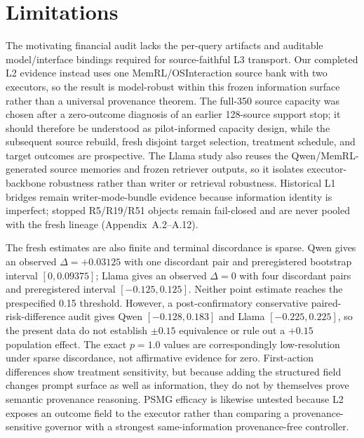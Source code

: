 \section{Limitations}
The motivating financial audit lacks the per-query artifacts and auditable model/interface bindings required for source-faithful L3 transport. Our completed L2 evidence instead uses one MemRL/OSInteraction source bank with two executors, so the result is model-robust within this frozen information surface rather than a universal provenance theorem. The full-350 source capacity was chosen after a zero-outcome diagnosis of an earlier 128-source support stop; it should therefore be understood as pilot-informed capacity design, while the subsequent source rebuild, fresh disjoint target selection, treatment schedule, and target outcomes are prospective. The Llama study also reuses the Qwen/MemRL-generated source memories and frozen retriever outputs, so it isolates executor-backbone robustness rather than writer or retrieval robustness. Historical L1 bridges remain writer-mode-bundle evidence because information identity is imperfect; stopped R5/R19/R51 objects remain fail-closed and are never pooled with the fresh lineage (Appendix~A.2--A.12).

The fresh estimates are also finite and terminal discordance is sparse. Qwen gives an observed $\Delta=+0.03125$ with one discordant pair and preregistered bootstrap interval $[0,0.09375]$; Llama gives an observed $\Delta=0$ with four discordant pairs and preregistered interval $[-0.125,0.125]$. Neither point estimate reaches the prespecified 0.15 threshold. However, a post-confirmatory conservative paired-risk-difference audit gives Qwen $[-0.128,0.183]$ and Llama $[-0.225,0.225]$, so the present data do not establish $\pm0.15$ equivalence or rule out a $+0.15$ population effect. The exact $p=1.0$ values are correspondingly low-resolution under sparse discordance, not affirmative evidence for zero. First-action differences show treatment sensitivity, but because adding the structured field changes prompt surface as well as information, they do not by themselves prove semantic provenance reasoning. PSMG efficacy is likewise untested because L2 exposes an outcome field to the executor rather than comparing a provenance-sensitive governor with a strongest same-information provenance-free controller.


